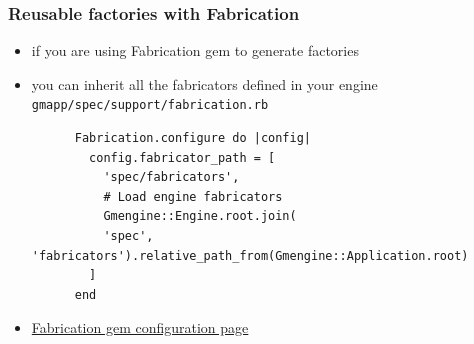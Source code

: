 \documentclass[compress]{beamer}
\begin{document}
\begin{frame}[fragile]
\frametitle{Reusable factories with Fabrication}
\begin{itemize}
  \item if you are using Fabrication gem to generate factories
  \item you can inherit all the fabricators defined in your engine
    \texttt{gmapp/spec/support/fabrication.rb}
    \begin{verbatim}
      Fabrication.configure do |config|
        config.fabricator_path = [
          'spec/fabricators',
          # Load engine fabricators
          Gmengine::Engine.root.join(
          'spec', 'fabricators').relative_path_from(Gmengine::Application.root)
        ]
      end
    \end{verbatim}
  \item \href{http://www.fabricationgem.org/#!configuration}{Fabrication gem configuration page}
\end{itemize}
\end{frame}
\end{document}
